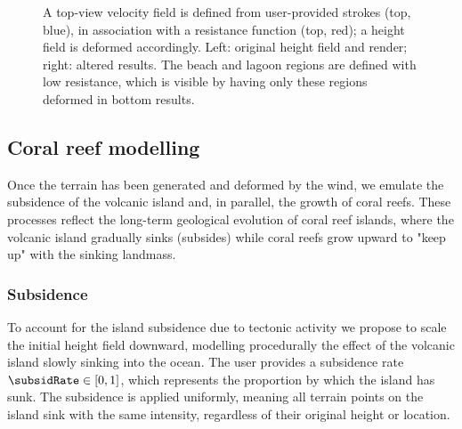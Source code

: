 \begin{figure}
    \caption[Island deformation on specific regions using resistance function]{A top-view velocity field is defined from user-provided strokes (top, blue), in association with a resistance function (top, red); a height field is deformed accordingly. Left: original height field and render; right: altered results. The beach and lagoon regions are defined with low resistance, which is visible by having only these regions deformed in bottom results.}
    \label{fig:coral-island-wind-effect-result}
\end{figure}


\subsection{Coral reef modelling}
\label{sec:coral-island-coral-reef}

Once the terrain has been generated and deformed by the wind, we emulate the subsidence of the volcanic island and, in parallel, the growth of coral reefs. These processes reflect the long-term geological evolution of coral reef islands, where the volcanic island gradually sinks (subsides) while coral reefs grow upward to "keep up" with the sinking landmass.

\subsubsection{Subsidence}
\label{sec:coral-island-subsidence}

To account for the island subsidence due to tectonic activity we propose to scale the initial height field downward, modelling procedurally the effect of the volcanic island slowly sinking into the ocean. The user provides a subsidence rate $\subsidRate \in [0, 1]$, which represents the proportion by which the island has sunk. The subsidence is applied uniformly, meaning all terrain points on the island sink with the same intensity, regardless of their original height or location.

